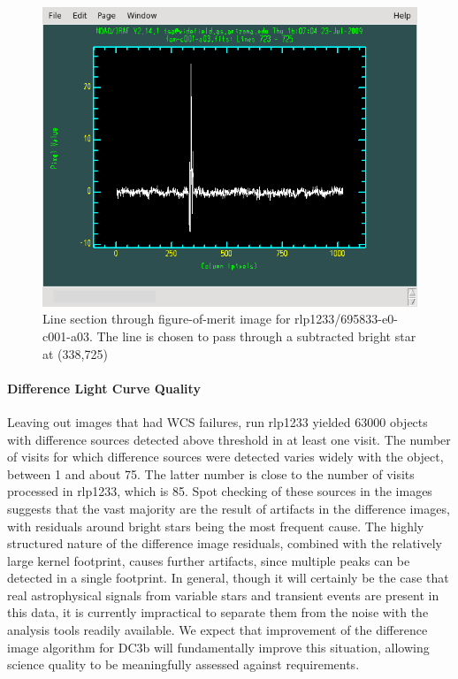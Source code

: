 \begin{figure}[hb]
\begin{center}
\includegraphics{images/rlp1233_v695833-e0-c001-a03-fom_plot.png}
\caption{Line section through figure-of-merit image for
  rlp1233/695833-e0-c001-a03.  The line is chosen to pass through a
  subtracted bright star at (338,725)}
\label{Figure 1}
\end{center}
\end{figure}

\paragraph{Difference Light Curve Quality}
Leaving out images that had WCS failures, run rlp1233 yielded 63000
objects with difference sources detected above threshold in at least
one visit. The number of visits
for which difference sources were detected varies widely with the object, between 1 and
about 75.  The latter number is close to the number of visits
processed in rlp1233, which is 85.  Spot checking of these sources in
the images suggests that the vast majority are the result of artifacts
in the difference images, with residuals around bright stars being the
most frequent cause.  The highly structured nature of the difference
image residuals, combined with the relatively large kernel footprint,
causes further artifacts, since multiple peaks can be detected in a
single footprint.  In general, though it will certainly be the case
that real astrophysical signals from variable stars and transient
events are present in this data, it is currently impractical to
separate them from the noise with the analysis tools readily
available.  We expect that improvement of the difference image
algorithm for DC3b will fundamentally improve this situation, allowing
science quality to be meaningfully assessed against requirements.


